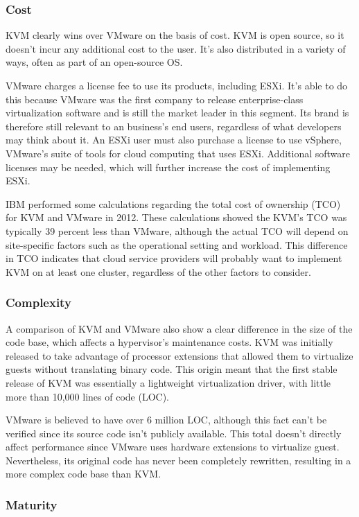 \documentclass[14pt]{extreport}
\begin{document}
\subsubsection{Cost}

KVM clearly wins over VMware on the basis of cost. KVM is open source, so it doesn’t incur any additional cost to the user. It’s also distributed in a variety of ways, often as part of an open-source OS.

VMware charges a license fee to use its products, including ESXi. It’s able to do this because VMware was the first company to release enterprise-class virtualization software and is still the market leader in this segment. Its brand is therefore still relevant to an business’s end users, regardless of what developers may think about it. An ESXi user must also purchase a license to use vSphere, VMware’s suite of tools for cloud computing that uses ESXi. Additional software licenses may be needed, which will further increase the cost of implementing ESXi.

IBM performed some calculations regarding the total cost of ownership (TCO) for KVM and VMware in 2012. These calculations showed the KVM’s TCO was typically 39 percent less than VMware, although the actual TCO will depend on site-specific factors such as the operational setting and workload. This difference in TCO indicates that cloud service providers will probably want to implement KVM on at least one cluster, regardless of the other factors to consider.
\subsubsection{Complexity}

A comparison of KVM and VMware also show a clear difference in the size of the code base, which affects a hypervisor’s maintenance costs. KVM was initially released to take advantage of processor extensions that allowed them to virtualize guests without translating binary code. This origin meant that the first stable release of KVM was essentially a lightweight virtualization driver, with little more than 10,000 lines of code (LOC).

VMware is believed to have over 6 million LOC, although this fact can’t be verified since its source code isn’t publicly available. This total doesn’t directly affect performance since VMware uses hardware extensions to virtualize guest. Nevertheless, its original code has never been completely rewritten, resulting in a more complex code base than KVM.
\subsubsection{Maturity}
\end{document}
